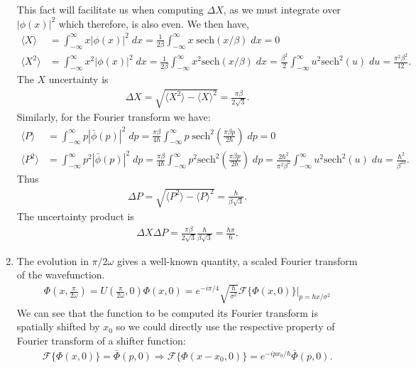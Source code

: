 \documentclass[letterpaper,11pt,twoside]{article}
\newcommand{\braket}[1]{\langle#1\rangle}
\begin{document}
\begin{enumerate}[itemsep=0pt,topsep=0pt,label=\alph*)]
  This fact will facilitate us when computing $\Delta X$, as we must integrate over $|\phi(x)|^2$ which therefore, is also even.
  We then have,
  \begin{align*}
    \braket{X}&=\int_{-\infty}^\infty x|\phi(x)|^2\;dx=\frac{1}{2\beta}\int_{-\infty}^\infty x\;\text{sech}(x/\beta)\;dx=0\\
    \braket{X^2}&=\int_{-\infty}^\infty x^2|\phi(x)|^2\;dx=\frac{1}{2\beta}\int_{-\infty}^\infty x^2\text{sech}(x/\beta)\;dx=\frac{\beta^2}{2}\int_{-\infty}^\infty u^2\text{sech}^2(u)\;du=\frac{\pi^2\beta^2}{12}.
  \end{align*}
  The $X$ uncertainty is 
  \begin{align*}
    \Delta X=\sqrt{\braket{X^2}-\braket{X}^2}=\frac{\pi\beta}{2\sqrt{3}}.
  \end{align*}
  Similarly, for the Fourier transform we have:
  \begin{align*}
    \braket{P}&=\int_{-\infty}^\infty p|\bar{\phi}(p)|^2\;dp=\frac{\pi\beta}{4\hbar}\int_{-\infty}^\infty p\;\text{sech}^2(\frac{\pi\beta p}{2\hbar})\;dp=0\\
    \braket{P^2}&=\int_{-\infty}^\infty p^2|\bar{\phi}(p)|^2\;dp=\frac{\pi\beta}{4\hbar}\int_{-\infty}^\infty p^2\text{sech}^2(\frac{\pi\beta p}{2\hbar})\;dp=\frac{2\hbar^2}{\pi^2\beta^2}\int_{-\infty}^\infty u^2\text{sech}^2(u)\;du=\frac{\hbar^2}{\beta^23}.
  \end{align*}
  Thus 
  \begin{align*}
    \Delta P=\sqrt{\braket{P^2}-\braket{P}^2}=\frac{\hbar}{\beta\sqrt{3}}.
  \end{align*}
  The uncertainty product is 
  \begin{align*}
    \Delta X\Delta P=\frac{\pi\beta}{2\sqrt{3}}\frac{\hbar}{\beta\sqrt{3}}=\frac{\hbar\pi}{6}.
  \end{align*}
  \item The evolution in $\pi/2\omega$ gives a well-known quantity, a scaled Fourier transform of the wavefunction.
  \begin{align*}
    \Phi(x,\frac{\pi}{2\omega})=U(\frac{\pi}{2\omega},0)\Phi(x,0)=e^{-i\pi/4}\sqrt{\frac{\hbar}{\sigma^2}}\mathcal{F}\{\Phi(x,0)\}\bigr|_{p=\hbar x/\sigma^2}
  \end{align*}
  We can see that the function to be computed its Fourier transform is spatially shifted by $x_0$ so we could directly use the respective property of Fourier transform of a shifter function:
  \begin{align*}
    \mathcal{F}\{\Phi(x,0)\}=\bar{\Phi}(p,0)\Longrightarrow \mathcal{F}\{\Phi(x-x_0,0)\}=e^{-ipx_0/\hbar}\bar{\Phi}(p,0).

\end{align*}
\end{enumerate}
\end{document}
